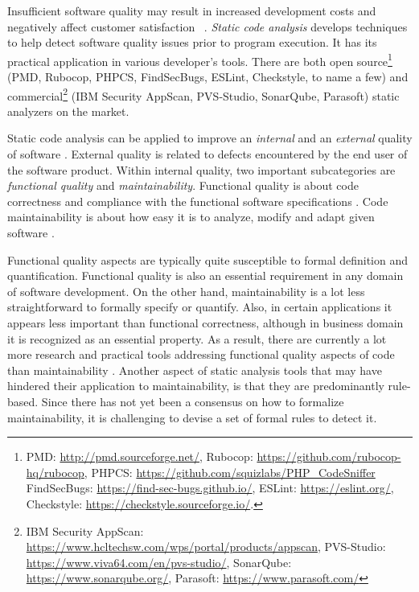 
Insufficient software quality may result in increased development costs and 
negatively affect customer satisfaction ~\citep{The_Economics_of_Software_Quality}. 
\textit{Static code analysis} develops techniques to help detect software quality 
issues prior to program execution. It has its practical application in various developer's tools. There are both open source\footnote{PMD: \url{http://pmd.sourceforge.net/}, Rubocop: \url{https://github.com/rubocop-hq/rubocop}, 
PHPCS: \url{https://github.com/squizlabs/PHP_CodeSniffer} 
FindSecBugs: \url{https://find-sec-bugs.github.io/}, ESLint: \url{https://eslint.org/}, Checkstyle: \url{https://checkstyle.sourceforge.io/}.} 
(PMD, Rubocop, PHPCS, FindSecBugs, ESLint, Checkstyle, to name a few) and commercial\footnote{IBM Security AppScan: \url{https://www.hcltechsw.com/wps/portal/products/appscan}, 
PVS-Studio: \url{https://www.viva64.com/en/pvs-studio/}, 
SonarQube: \url{https://www.sonarqube.org/}, 
Parasoft: \url{https://www.parasoft.com/}} 
(IBM Security AppScan, PVS-Studio, SonarQube, Parasoft) static analyzers 
on the market.

Static code analysis can be applied to improve an \textit{internal} and an
\textit{external} quality of software \citep{Ilyas2016StaticCA}. External
quality is related to defects encountered by the end user of the software
product. Within internal quality, two important subcategories are
\textit{functional quality} and \textit{maintainability}. Functional quality is
about code correctness and compliance with the functional software
specifications \citep{Farhan}. Code maintainability is about how easy it is to
analyze, modify and adapt given software \citep{Mohammadi2013AnAO}.

Functional quality aspects are typically quite susceptible to formal definition
and quantification.
Functional quality is also an essential
requirement in any domain of software development. On the other hand,
maintainability is a lot less straightforward to formally specify or quantify.
Also, in certain applications it appears less important than
functional correctness, although in business domain it is recognized as an
essential property.
As a result, there are currently a lot more
research and practical tools addressing functional quality aspects of code than
maintainability \citep{Overview_Static_Code_Analysis_in_Software_Development}.
Another aspect of static analysis tools that may have hindered their application
to maintainability, is that they are predominantly rule-based. Since there has
not yet been a consensus on how to formalize maintainability, it is challenging
to devise a set of formal rules to detect it.

